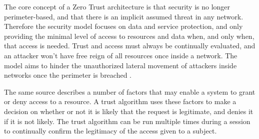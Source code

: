 The core concept of a Zero Trust architecture is that security is no longer perimeter-based,
and that there is an implicit assumed threat in any network.
Therefore the security model focuses on data and service protection,
and only providing the minimal level of access to resources and data when, and only when, that access is needed.
Trust and access must always be continually evaluated,
and an attacker won't have free reign of all resources once inside a network.
The model aims to hinder the unauthorized lateral movement of attackers inside networks once the perimeter is breached 
\cite{rose_zero_2020}. 

The same source describes a number of factors that may enable a system to grant or deny access to a resource. A trust algorithm uses these factors to make a decision on whether or not it is likely that the request is legitimate, and denies it if it is not likely. The trust algorithm can be run multiple times during a session to continually confirm the legitimacy of the access given to a subject. 
 
% 
% 
% 


